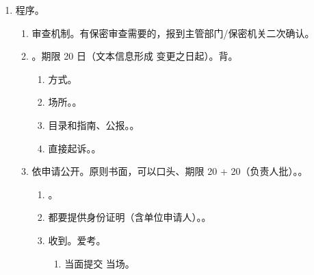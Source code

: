 \begin{enumerate}
\begin{enumerate}
\begin{enumerate}
\begin{enumerate}
                        \end{enumerate}
                  \item {}。与你无关，这辈子你都见不到。。
                  \item {}。。
                  \item \sjt 不公开 \bdy 它们不属于政府信息。
                \end{enumerate}
          \item 会细到不公开的原因是啥，要能对得上。。
        \end{enumerate}
  \item 程序。
        \begin{enumerate}
          \item 审查机制。有保密审查需要的，报到主管部门/保密机关二次确认。
          \item {}。期限 20 日（文本信息形成 \hz 变更之日起）。背。
                \begin{enumerate}
                  \item 方式。
                  \item 场所。。
                  \item 目录和指南、公报。。
                  \item 直接起诉。。
                \end{enumerate}
          \item 依申请公开。原则书面，可以口头、期限 20 + 20（负责人批）。。
                \begin{enumerate}
                  \item {}。
                  \item 都要提供身份证明（含单位申请人）。。
                  \item 收到。爱考。
                        \begin{enumerate}
                          \item 当面提交 \yjt 当场。

\end{enumerate}
\end{enumerate}
\end{enumerate}
\end{enumerate}
